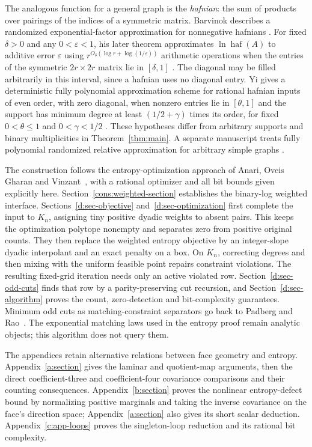 The analogous function for a general graph is the \emph{hafnian}: the
sum of products over pairings of the indices of a symmetric matrix.
Barvinok describes a randomized exponential-factor approximation for
nonnegative hafnians \citep[author preprint, Section~7]{Barvinok1999}.
For fixed $\delta>0$ and any $0<\varepsilon<1$, his later theorem approximates
$\ln\operatorname{haf}(A)$ to additive error $\varepsilon$ using
$r^{O_\delta(\log r+\log(1/\varepsilon))}$ arithmetic operations when the entries of the
symmetric $2r\times2r$ matrix lie in $[\delta,1]$
\citep[Theorem~2.1]{Barvinok2017}. The diagonal may be filled arbitrarily
in this interval, since a hafnian uses no diagonal entry.
Yi gives a deterministic fully polynomial approximation scheme for
rational hafnian inputs of even order, with zero diagonal, when nonzero
entries lie in $[\theta,1]$ and the support has minimum degree at least
$(1/2+\gamma)$ times its order, for fixed $0<\theta\le1$ and
$0<\gamma<1/2$ \citep[Theorem~1.1(a)]{Yi2026}. These hypotheses differ from arbitrary supports and binary
multiplicities in Theorem~\ref{thm:main}. A separate manuscript treats
fully polynomial randomized relative approximation for arbitrary simple
graphs \citep[Theorem~1.1]{OpenAIMatchingFPRAS2026}.

The construction follows the entropy-optimization approach of
Anari, Oveis Gharan and Vinzant~\citep[FOCS version, Section~I.D]{AnariOveisGharanVinzant2018},
with a rational optimizer and all bit bounds given explicitly here.
Section~\ref{cons:weighted-section} establishes the binary-log weighted
interface. Sections~\ref{d:sec-objective} and~\ref{d:sec-optimization}
first complete the input to $K_n$, assigning tiny positive dyadic
weights to absent pairs. This keeps the optimization polytope nonempty
and separates zero from positive original counts. They then replace
the weighted entropy objective by an integer-slope dyadic interpolant
and an exact penalty on a box. On $K_n$, correcting degrees and then
mixing with the uniform feasible point repairs constraint violations. The resulting fixed-grid
iteration needs only an active violated row. Section~\ref{d:sec-odd-cuts}
finds that row by a parity-preserving cut recursion, and
Section~\ref{d:sec-algorithm} proves the count, zero-detection and
bit-complexity guarantees. Minimum odd cuts as matching-constraint
separators go back to Padberg and Rao~\citep{PadbergRao1982}.
The exponential matching laws used in the entropy proof remain analytic
objects; this algorithm does not query them.

The appendices retain alternative relations between face geometry and
entropy. Appendix~\ref{a:section} gives the laminar and quotient-map
arguments, then the direct coefficient-three and coefficient-four
covariance comparisons and their counting consequences.
Appendix~\ref{b:section} proves the nonlinear entropy-defect bound by
normalizing positive marginals and taking the inverse covariance on
the face's direction space; Appendix~\ref{a:section} also gives its
short scalar deduction. Appendix~\ref{c:app-loops} proves the
singleton-loop reduction and its rational bit complexity.


